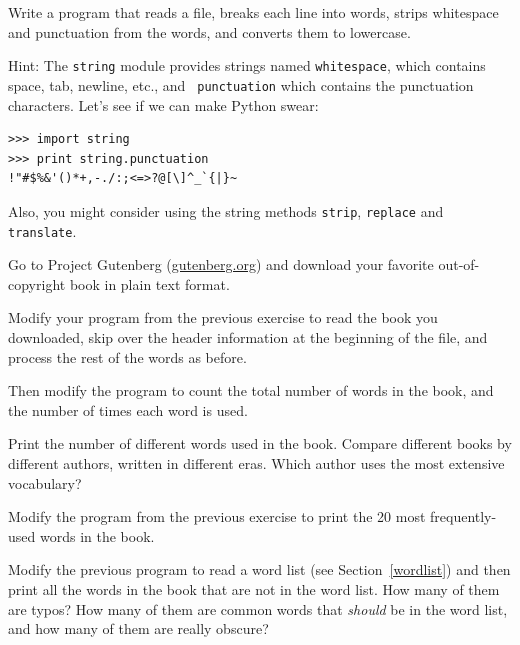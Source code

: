 \documentclass[10pt]{book}
\begin{document}
\begin{CJK}{UTF8}{gbsn}
\begin{exercise}
Write a program that reads a file, breaks each line into
words, strips whitespace and punctuation from the words, and
converts them to lowercase.

Hint: The {\tt string} module provides strings named {\tt whitespace},
which contains space, tab, newline, etc., and {\tt
  punctuation} which contains the punctuation characters.  Let's see
if we can make Python swear:

\begin{verbatim}
>>> import string
>>> print string.punctuation
!"#$%&'()*+,-./:;<=>?@[\]^_`{|}~
\end{verbatim}
%
Also, you might consider using the string methods {\tt strip},
{\tt replace} and {\tt translate}.

\end{exercise}


\begin{exercise}

Go to Project Gutenberg (\url{gutenberg.org}) and download 
your favorite out-of-copyright book in plain text format.

Modify your program from the previous exercise to read the book
you downloaded, skip over the header information at the beginning
of the file, and process the rest of the words as before.

Then modify the program to count the total number of words in
the book, and the number of times each word is used.

Print the number of different words used in the book.  Compare
different books by different authors, written in different eras.
Which author uses the most extensive vocabulary?
\end{exercise}


\begin{exercise}

Modify the program from the previous exercise to print the
20 most frequently-used words in the book.

\end{exercise}


\begin{exercise}

Modify the previous program to read a word list (see
Section~\ref{wordlist}) and then print all the words in the book that
are not in the word list.  How many of them are typos?  How many of
them are common words that {\em should} be in the word list, and how
many of them are really obscure?


\end{exercise}
\end{CJK}
\end{document}
